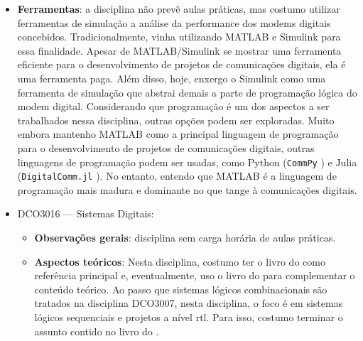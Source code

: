 \documentclass{article}
\begin{document}
\begin{itemize}
    \item \textbf{Ferramentas}: a disciplina não prevê aulas práticas, mas costumo utilizar ferramentas de simulação a análise da performance dos modems digitais concebidos. Tradicionalmente, vinha utilizando MATLAB e Simulink para essa finalidade. Apesar de MATLAB/Simulink se mostrar uma ferramenta eficiente para o desenvolvimento de projetos de comunicações digitais, ela é uma ferramenta paga. Além disso, hoje, enxergo o Simulink como uma ferramenta de simulação que abstrai demais a parte de programação lógica do modem digital. Considerando que programação é um dos aspectos a ser trabalhados nessa disciplina, outras opções podem ser exploradas. Muito embora mantenho MATLAB como a principal linguagem de programação para o desenvolvimento de projetos de comunicações digitais, outras linguagens de programação podem ser usadas, como Python (\texttt{CommPy} \cite{taranalliVeereshtCommPy2026}) e Julia (\texttt{DigitalComm.jl} \cite{robingerzaguetJuliaTelecomDigitalCommjl2026}). No entanto, entendo que MATLAB é a linguagem de programação mais madura e dominante no que tange à comunicações digitais.
    \item DCO3016 --- Sistemas Digitais:
    \begin{itemize}
        \item \textbf{Observações gerais}: disciplina sem carga horária de aulas práticas.
        \item \textbf{Aspectos teóricos}: Nesta disciplina, costumo ter o livro do \textcite{vahidDigitalDesignRTL2010} como referência principal e, eventualmente, uso o livro do \textcite{tocciDigitalSystems2017} para complementar o conteúdo teórico. Ao passo que sistemas lógicos combinacionais são tratados na disciplina DCO3007, nesta disciplina, o foco é em sistemas lógicos sequenciais e projetos a nível \gls{rtl}. Para isso, costumo terminar o assunto contido no livro do \textcite{vahidDigitalDesignRTL2010}.

\end{itemize}
\end{itemize}
\end{document}
